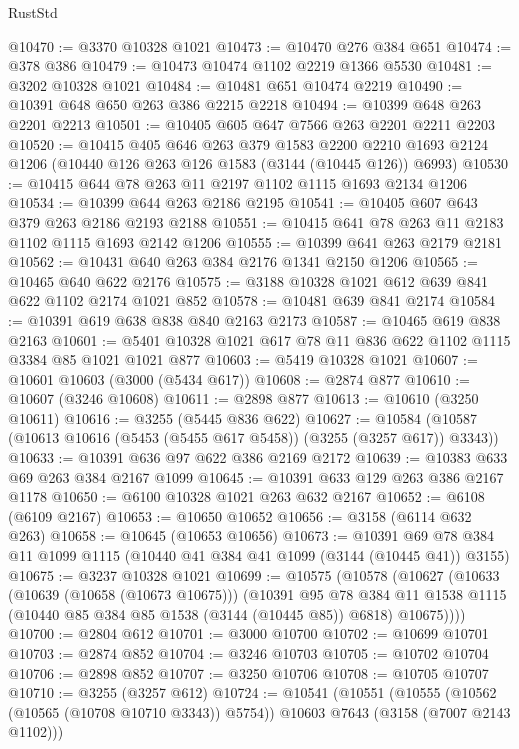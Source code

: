 \begin{lexlean}{RustStd}
\begin{coremodule}
{\begin{coremodule}
{{{{{{{{{{{{{{{{{{{{{{{{{{@10470 := @3370 @10328 @1021
@10473 := @10470 @276 @384 @651
@10474 := @378 @386
@10479 := @10473 @10474 @1102 @2219 @1366 @5530
@10481 := @3202 @10328 @1021
@10484 := @10481 @651 @10474 @2219
@10490 := @10391 @648 @650 @263 @386 @2215 @2218
@10494 := @10399 @648 @263 @2201 @2213
@10501 := @10405 @605 @647 @7566 @263 @2201 @2211 @2203
@10520 := @10415
    @405
    @646
    @263
    @379
    @1583
    @2200
    @2210
    @1693
    @2124
    @1206
    (@10440 @126 @263 @126 @1583 (@3144 (@10445 @126)) @6993)
@10530 := @10415 @644 @78 @263 @11 @2197 @1102 @1115 @1693 @2134 @1206
@10534 := @10399 @644 @263 @2186 @2195
@10541 := @10405 @607 @643 @379 @263 @2186 @2193 @2188
@10551 := @10415 @641 @78 @263 @11 @2183 @1102 @1115 @1693 @2142 @1206
@10555 := @10399 @641 @263 @2179 @2181
@10562 := @10431 @640 @263 @384 @2176 @1341 @2150 @1206
@10565 := @10465 @640 @622 @2176
@10575 := @3188 @10328 @1021 @612 @639 @841 @622 @1102 @2174 @1021 @852
@10578 := @10481 @639 @841 @2174
@10584 := @10391 @619 @638 @838 @840 @2163 @2173
@10587 := @10465 @619 @838 @2163
@10601 := @5401 @10328 @1021 @617 @78 @11 @836 @622 @1102 @1115 @3384 @85 @1021 @1021 @877
@10603 := @5419 @10328 @1021
@10607 := @10601 @10603 (@3000 (@5434 @617))
@10608 := @2874 @877
@10610 := @10607 (@3246 @10608)
@10611 := @2898 @877
@10613 := @10610 (@3250 @10611)
@10616 := @3255 (@5445 @836 @622)
@10627 := @10584 (@10587 (@10613 @10616 (@5453 (@5455 @617 @5458)) (@3255 (@3257 @617)) @3343))
@10633 := @10391 @636 @97 @622 @386 @2169 @2172
@10639 := @10383 @633 @69 @263 @384 @2167 @1099
@10645 := @10391 @633 @129 @263 @386 @2167 @1178
@10650 := @6100 @10328 @1021 @263 @632 @2167
@10652 := @6108 (@6109 @2167)
@10653 := @10650 @10652
@10656 := @3158 (@6114 @632 @263)
@10658 := @10645 (@10653 @10656)
@10673 := @10391 @69 @78 @384 @11 @1099 @1115 (@10440 @41 @384 @41 @1099 (@3144 (@10445 @41)) @3155)
@10675 := @3237 @10328 @1021
@10699 := @10575
    (@10578
      (@10627
        (@10633
          (@10639 (@10658 (@10673 @10675)))
          (@10391
            @95
            @78
            @384
            @11
            @1538
            @1115
            (@10440 @85 @384 @85 @1538 (@3144 (@10445 @85)) @6818)
            @10675))))
@10700 := @2804 @612
@10701 := @3000 @10700
@10702 := @10699 @10701
@10703 := @2874 @852
@10704 := @3246 @10703
@10705 := @10702 @10704
@10706 := @2898 @852
@10707 := @3250 @10706
@10708 := @10705 @10707
@10710 := @3255 (@3257 @612)
@10724 := @10541
    (@10551
      (@10555 (@10562 (@10565 (@10708 @10710 @3343)) @5754))
      @10603
      @7643
      (@3158 (@7007 @2143 @1102)))
}}}}}}}}}}}}}}}}}}}}}}}}}}
\end{coremodule}}
\end{coremodule}
\end{lexlean}
